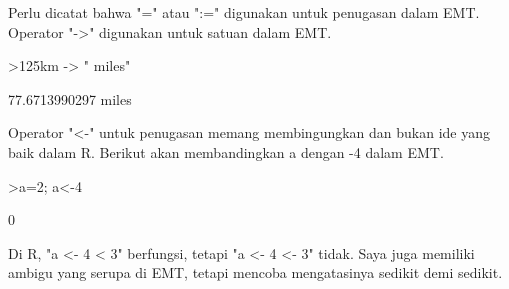 \documentclass[12pt,arial,letterpaper]{book}
\begin{document}
\begin{eulercomment}
\begin{eulercomment}
\begin{eulercomment}
\begin{eulercomment}
\begin{eulercomment}
\begin{eulercomment}
\begin{eulercomment}
\begin{eulercomment}
\begin{eulercomment}
\begin{eulercomment}
\begin{eulercomment}
\begin{eulercomment}
\begin{eulercomment}
\begin{eulercomment}
\begin{eulercomment}
\begin{eulercomment}
\begin{eulercomment}
\begin{eulercomment}
\begin{eulercomment}
\begin{eulercomment}
\begin{eulercomment}
\begin{eulercomment}
\begin{eulercomment}
\begin{eulercomment}
\begin{eulercomment}
\begin{eulercomment}
\begin{eulercomment}
\begin{eulercomment}
\begin{eulercomment}
\begin{eulercomment}
\begin{eulercomment}
\begin{eulercomment}
\begin{eulercomment}
\begin{eulercomment}
\begin{eulercomment}
\begin{eulercomment}
\begin{eulercomment}
Perlu dicatat bahwa "=" atau ":=" digunakan untuk penugasan dalam EMT.
Operator "-\textgreater{}" digunakan untuk satuan dalam EMT.
\end{eulercomment}
\begin{eulerprompt}
>125km -> " miles"
\end{eulerprompt}
\begin{euleroutput}
  77.6713990297 miles
\end{euleroutput}
\begin{eulercomment}
Operator "\textless{}-" untuk penugasan memang membingungkan dan bukan ide yang
baik dalam R. Berikut akan membandingkan a dengan -4 dalam EMT.
\end{eulercomment}
\begin{eulerprompt}
>a=2; a<-4
\end{eulerprompt}
\begin{euleroutput}
  0
\end{euleroutput}
\begin{eulercomment}
Di R, "a \textless{}- 4 \textless{} 3" berfungsi, tetapi "a \textless{}- 4 \textless{}- 3" tidak. Saya juga
memiliki ambigu yang serupa di EMT, tetapi mencoba mengatasinya
sedikit demi sedikit.


\end{eulercomment}
\end{eulercomment}
\end{eulercomment}
\end{eulercomment}
\end{eulercomment}
\end{eulercomment}
\end{eulercomment}
\end{eulercomment}
\end{eulercomment}
\end{eulercomment}
\end{eulercomment}
\end{eulercomment}
\end{eulercomment}
\end{eulercomment}
\end{eulercomment}
\end{eulercomment}
\end{eulercomment}
\end{eulercomment}
\end{eulercomment}
\end{eulercomment}
\end{eulercomment}
\end{eulercomment}
\end{eulercomment}
\end{eulercomment}
\end{eulercomment}
\end{eulercomment}
\end{eulercomment}
\end{eulercomment}
\end{eulercomment}
\end{eulercomment}
\end{eulercomment}
\end{eulercomment}
\end{eulercomment}
\end{eulercomment}
\end{eulercomment}
\end{eulercomment}
\end{eulercomment}
\end{document}
